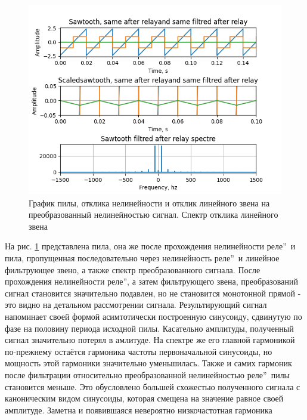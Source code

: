 \begin{figure}[H]
	\centering
	\includegraphics[width=0.95\linewidth]{body/images/sawtooth-after-filtred-relay-and-its-spectre.png}
	\caption{График пилы, отклика нелинейности и отклик линейного звена на преобразованный
	нелинейностью сигнал. Спектр отклика линейного звена}
	\label{fig:24}
\end{figure}

На рис. \ref{fig:24} представлена пила, она же после прохождения
нелинейности  реле\textquotedblright\ и пила,
пропущенная последовательно через нелинейность
 реле\textquotedblright\ и 
линейное фильтрующее звено, а также спектр преобразованного сигнала.
После прохождения нелинейности  реле\textquotedblright, а
затем фильтрующего звена, преобразований сигнал становится значительно подавлен,
но не становится монотонной прямой - это видно на детальном рассмотрении сигнала.
Результирующий сигнал напоминает своей формой асимтотически построенную синусоиду,
сдвинутую по фазе на половину периода исходной пилы. Касательно амплитуды,
полученный сигнал значительно потерял в амлитуде. На спектре же его главной
гармоникой по-прежнему остаётся гармоника частоты первоначальной синусоиды,
но мощность этой гармоники значительно уменьшилась. Также и самих гармоник
после фильтрации относительно преобразованной нелинейностью
 реле\textquotedblright\ пилы становится
меньше. Это обусловлено большей схожестью полученного сигнала с каноническим
видом синусоиды, которая смещена на значение равное своей амплитуде.
Заметна и появившаяся невероятно низкочастотная гармоника

